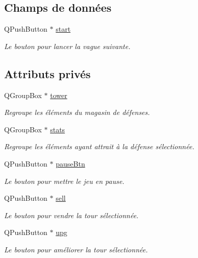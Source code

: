 \subsection*{Champs de données}
\begin{DoxyCompactItemize}
\item 
QPushButton $\ast$ \hyperlink{classUI_a02df204852b5bbb75015490337b1da5f}{start}
\begin{DoxyCompactList}\small\item\em Le bouton pour lancer la vague suivante. \end{DoxyCompactList}\end{DoxyCompactItemize}
\subsection*{Attributs privés}
\begin{DoxyCompactItemize}
\item 
QGroupBox $\ast$ \hyperlink{classUI_a352f80a494c8d3c1723f1248438ea912}{tower}
\begin{DoxyCompactList}\small\item\em Regroupe les éléments du magasin de défenses. \end{DoxyCompactList}\item 
QGroupBox $\ast$ \hyperlink{classUI_a04ffefe0b9ef54d2ebc76595b00bb900}{stats}
\begin{DoxyCompactList}\small\item\em Regroupe les éléments ayant attrait à la défense sélectionnée. \end{DoxyCompactList}\item 
QPushButton $\ast$ \hyperlink{classUI_a521e74a190e8d9dec345af91860f861e}{pauseBtn}
\begin{DoxyCompactList}\small\item\em Le bouton pour mettre le jeu en pause. \end{DoxyCompactList}\item 
QPushButton $\ast$ \hyperlink{classUI_a4e35fb65ac2aa948adb7f7b9eb94d5c2}{sell}
\begin{DoxyCompactList}\small\item\em Le bouton pour vendre la tour sélectionnée. \end{DoxyCompactList}\item 
QPushButton $\ast$ \hyperlink{classUI_abf5a7181f1e80c8873cfae97be8e8b4f}{upg}
\begin{DoxyCompactList}\small\item\em Le bouton pour améliorer la tour sélectionnée. \end{DoxyCompactList}\item 

\end{DoxyCompactItemize}
